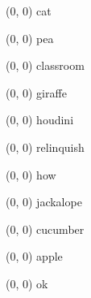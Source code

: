 \documentclass[11pt]{letter} %
\begin{document}
\begin{textblock}{0}(0, 0) \Large{cat} \end{textblock}
\begin{textblock}{0}(0, 0) \Large{pea} \end{textblock}
\begin{textblock}{0}(0, 0) \LARGE{classroom} \end{textblock}
\begin{textblock}{0}(0, 0) \LARGE{giraffe} \end{textblock}
\begin{textblock}{0}(0, 0) \LARGE{houdini} \end{textblock}
\begin{textblock}{0}(0, 0) \huge{relinquish} \end{textblock}
\begin{textblock}{0}(0, 0) \huge{how} \end{textblock}
\begin{textblock}{0}(0, 0) \huge{jackalope} \end{textblock}
\begin{textblock}{0}(0, 0) \Huge{cucumber} \end{textblock}
\begin{textblock}{0}(0, 0) \Huge{apple} \end{textblock}
\begin{textblock}{0}(0, 0) \Huge{ok} \end{textblock}
\end{document}
